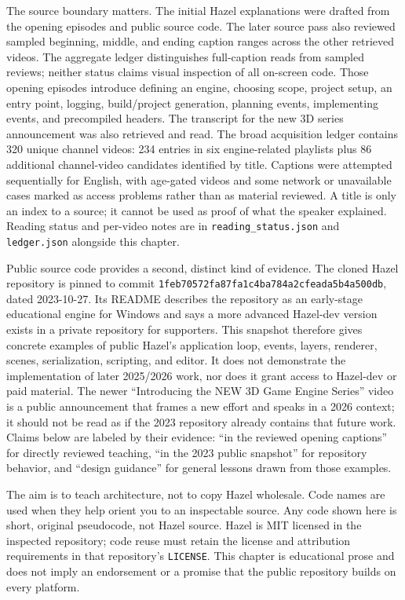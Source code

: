 The source boundary matters. The initial Hazel explanations were drafted from the opening episodes and public source code. The later source pass also reviewed sampled beginning, middle, and ending caption ranges across the other retrieved videos. The aggregate ledger distinguishes full-caption reads from sampled reviews; neither status claims visual inspection of all on-screen code. Those opening episodes introduce defining an engine, choosing scope, project setup, an entry point, logging, build/project generation, planning events, implementing events, and precompiled headers. The transcript for the new 3D series announcement was also retrieved and read. The broad acquisition ledger contains 320 unique channel videos: 234 entries in six engine-related playlists plus 86 additional channel-video candidates identified by title. Captions were attempted sequentially for English, with age-gated videos and some network or unavailable cases marked as access problems rather than as material reviewed. A title is only an index to a source; it cannot be used as proof of what the speaker explained. Reading status and per-video notes are in \texttt{reading\_status.json} and \texttt{ledger.json} alongside this chapter.

Public source code provides a second, distinct kind of evidence. The cloned Hazel repository is pinned to commit \texttt{1feb70572fa87fa1c4ba784a2cfeada5b4a500db}, dated 2023-10-27. Its README describes the repository as an early-stage educational engine for Windows and says a more advanced Hazel-dev version exists in a private repository for supporters. This snapshot therefore gives concrete examples of public Hazel's application loop, events, layers, renderer, scenes, serialization, scripting, and editor. It does not demonstrate the implementation of later 2025/2026 work, nor does it grant access to Hazel-dev or paid material. The newer ``Introducing the NEW 3D Game Engine Series'' video is a public announcement that frames a new effort and speaks in a 2026 context; it should not be read as if the 2023 repository already contains that future work. Claims below are labeled by their evidence: ``in the reviewed opening captions'' for directly reviewed teaching, ``in the 2023 public snapshot'' for repository behavior, and ``design guidance'' for general lessons drawn from those examples.

The aim is to teach architecture, not to copy Hazel wholesale. Code names are used when they help orient you to an inspectable source. Any code shown here is short, original pseudocode, not Hazel source. Hazel is MIT licensed in the inspected repository; code reuse must retain the license and attribution requirements in that repository's \texttt{LICENSE}. This chapter is educational prose and does not imply an endorsement or a promise that the public repository builds on every platform.

